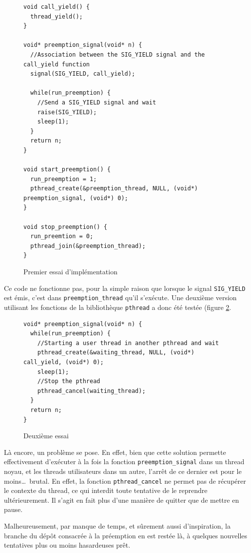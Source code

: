 \documentclass[a4paper,11pt]{article}
\begin{document}
\begin{figure}[H]
\begin{lstlisting}
void call_yield() {
  thread_yield();
}

void* preemption_signal(void* n) {
  //Association between the SIG_YIELD signal and the call_yield function
  signal(SIG_YIELD, call_yield);

  while(run_preemption) {
    //Send a SIG_YIELD signal and wait
    raise(SIG_YIELD);
    sleep(1);
  }
  return n;
}

void start_preemption() {
  run_preemption = 1;
  pthread_create(&preemption_thread, NULL, (void*) preemption_signal, (void*) 0);
}

void stop_preemption() {
  run_preemtion = 0;
  pthread_join(&preemption_thread);
}
\end{lstlisting}
\caption{Premier essai d'implémentation}
\label{codepreemption1}
\end{figure}

Ce code ne fonctionne pas, pour la simple raison que lorsque le signal \texttt{SIG\_YIELD} est émis, c'est dans \texttt{preemption\_thread} qu'il s'exécute. Une deuxième version utilisant les fonctions de la bibliothèque \texttt{pthread} a donc été testée (figure \ref{codepreemption2}.

\begin{figure}[H]
\begin{lstlisting}
void* preemption_signal(void* n) {
  while(run_preemption) {
    //Starting a user thread in another pthread and wait
    pthread_create(&waiting_thread, NULL, (void*) call_yield, (void*) 0);
    sleep(1);
    //Stop the pthread
    pthread_cancel(waiting_thread);
  }
  return n;
}
\end{lstlisting}
\caption{Deuxième essai}
\label{codepreemption2}
\end{figure}

Là encore, un problème se pose. En effet, bien que cette solution permette effectivement d'exécuter à la fois la fonction \texttt{preemption\_signal} dans un thread noyau, et les threads utilisateurs dans un autre, l'arrêt de ce dernier est pour le moins\dots\ brutal. En effet, la fonction \texttt{pthread\_cancel} ne permet pas de récupérer le contexte du thread, ce qui interdit toute tentative de le reprendre ultérieurement. Il s'agit en fait plus d'une manière de quitter que de mettre en pause.

Malheureusement, par manque de temps, et sûrement aussi d'inspiration, la branche du dépôt consacrée à la préemption en est restée là, à quelques nouvelles tentatives plus ou moins hasardeuses prêt.
\end{document}

